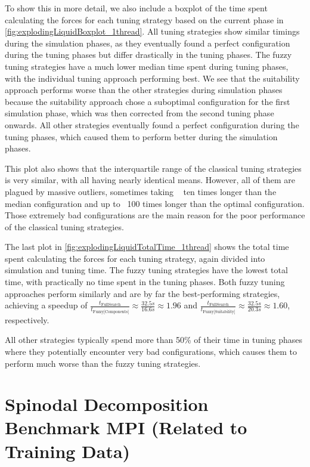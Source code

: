 To show this in more detail, we also include a boxplot of the time spent calculating the forces for each tuning strategy based on the current phase in \autoref{fig:explodingLiquidBoxplot_1thread}. All tuning strategies show similar timings during the simulation phases, as they eventually found a perfect configuration during the tuning phases but differ drastically in the tuning phases. The fuzzy tuning strategies have a much lower median time spent during tuning phases, with the individual tuning approach performing best. We see that the suitability approach performs worse than the other strategies during simulation phases because the suitability approach chose a suboptimal configuration for the first simulation phase, which was then corrected from the second tuning phase onwards. All other strategies eventually found a perfect configuration during the tuning phases, which caused them to perform better during the simulation phases.

This plot also shows that the interquartile range of the classical tuning strategies is very similar, with all having nearly identical means. However, all of them are plagued by massive outliers, sometimes taking ~ ten times longer than the median configuration and up to ~100 times longer than the optimal configuration. Those extremely bad configurations are the main reason for the poor performance of the classical tuning strategies.

The last plot in \autoref{fig:explodingLiquidTotalTime_1thread} shows the total time spent calculating the forces for each tuning strategy, again divided into simulation and tuning time. The fuzzy tuning strategies have the lowest total time, with practically no time spent in the tuning phases. Both fuzzy tuning approaches perform similarly and are by far the best-performing strategies, achieving a speedup of $\frac{t_{\text{FullSearch}}}{t_{\text{Fuzzy[Components]}}} \approx \frac{32.5s}{16.6s} \approx 1.96$ and $\frac{t_{\text{FullSearch}}}{t_{\text{Fuzzy[Suitability]}}} \approx \frac{32.5s}{20.3s} \approx 1.60$, respectively.

All other strategies typically spend more than 50\% of their time in tuning phases where they potentially encounter very bad configurations, which causes them to perform much worse than the fuzzy tuning strategies.


\section{Spinodal Decomposition Benchmark MPI (Related to Training Data)}

